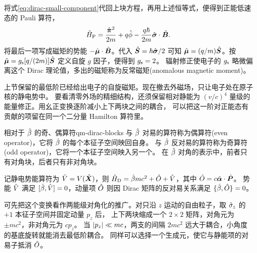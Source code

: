将式\eqref{eq:dirac-small-component}代回上块方程，再用上述恒等式，便得到正能低速态的 Pauli 算符，
\begin{equation}
    \hat{H}_{\mathrm{P}} = \frac{\hat{\bm{\pi}}^2}{2m} + q\hat{\phi} - \frac{q\hbar}{2m}\hat{\bm{\sigma}} \cdot \hat{\bm{B}}.
\end{equation}
将最后一项写成磁矩的势能 $-\hat{\bm{\mu}} \cdot \hat{\bm{B}}$。代入 $\hat{\bm{S}} = \hbar\hat{\bm{\sigma}}/2$ 可知 $\hat{\bm{\mu}} = (q/m)\hat{\bm{S}}$。按 $\hat{\bm{\mu}} = g_{\mathrm{s}}[q/(2m)]\hat{\bm{S}}$ 定义自旋 $g$ 因子，便得到 $g_{\mathrm{s}} = 2$。
辐射修正使电子的 $g_{\mathrm{s}}$ 略微偏离这个 Dirac 理论值，多出的磁矩称为反常磁矩(anomalous magnetic moment)。

\label{sec:fw}
上节保留的最低阶已经给出电子的自旋磁矩。现在撤去外磁场，只让电子处在原子核的静电势中。
要看清零外场的精细结构，还须保留相对静能为 $(v/c)^4$ 量级的能量修正。用幺正变换逐阶减小上下两块之间的耦合，
可以把这一阶对正能态有贡献的项留在同一个二分量 Hamilton 算符里。

\begin{definition}{相对于 \texorpdfstring{$\hat{\beta}$}{β} 的奇、偶算符}{qm-dirac-blocks}
    与 $\hat{\beta}$ 对易的算符称为偶算符(even operator)，它将 $\hat{\beta}$ 的每个本征子空间映回自身。
    与 $\hat{\beta}$ 反对易的算符称为奇算符(odd operator)，它将一个本征子空间映入另一个。
    在 $\hat{\beta}$ 对角的表示中，前者只有对角块，后者只有非对角块。
\end{definition}
记静电势能算符为 $\hat{V} = V(\hat{\bm{X}})$，则 $\hat{H}_{\mathrm{D}} = \hat{\beta} mc^2 + \hat{O} + \hat{V}$，其中 $\hat{O} = c\hat{\bm{\alpha}} \cdot \hat{\bm{P}}$。
势能 $\hat{V}$ 满足 $[\hat{\beta},\hat{V}] = 0$，动量项 $\hat{O}$ 则因 Dirac 矩阵的反对易关系满足 $\{\hat{\beta},\hat{O}\} = 0$。

可先把这个变换看作两能级对角化的推广。对只沿 $z$ 运动的自由粒子，取 $\hat{\sigma}_z$ 的 $+1$ 本征子空间并固定动量 $p_z$ 后，
上下两块缩成一个 $2 \times 2$ 矩阵，对角元为 $\pm mc^2$，非对角元为 $cp_z$。
当 $\lvert p_z\rvert \ll mc$，两支的间隔 $2mc^2$ 远大于耦合，小角度的基底旋转就能消去最低阶耦合。
同样可以选择一个生成元，使它与静能项的对易子抵消 $\hat{O}$。

